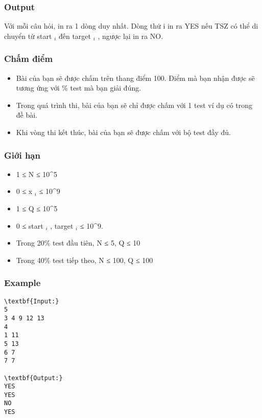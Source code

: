 \subsubsection{Output}

Với mỗi câu hỏi, in ra 1 dòng duy nhất. Dòng thứ i in ra YES nếu TSZ có thể di chuyển từ start $_ i $ đến target $_ i $ , ngược lại in ra NO.

\subsubsection{Chấm điểm}
\begin{itemize}
	\item Bài của bạn sẽ được chấm trên thang điểm 100. Điểm mà bạn nhận được sẽ tương ứng với \% test mà bạn giải đúng.
	\item Trong quá trình thi, bài của bạn sẽ chỉ được chấm với 1 test ví dụ có trong đề bài.
	\item Khi vòng thi kết thúc, bài của bạn sẽ được chấm với bộ test đầy đủ.
\end{itemize}

\subsubsection{Giới hạn}
\begin{itemize}
	\item 1 ≤ N ≤ 10^5
	\item 0 ≤ x $_ i $ ≤ 10^9
	\item 1 ≤ Q ≤ 10^5
	\item 0 ≤ start $_ i $ , target $_ i $ ≤ 10^9.
	\item Trong 20\% test đầu tiên, N ≤ 5, Q ≤ 10
	\item Trong 40\% test tiếp theo, N ≤ 100, Q ≤ 100
\end{itemize}

\subsubsection{Example}
\begin{verbatim}
\textbf{Input:}
5
3 4 9 12 13
4
1 11
5 13
6 7
7 7

\textbf{Output:}
YES
YES
NO
YES
\end{verbatim}

